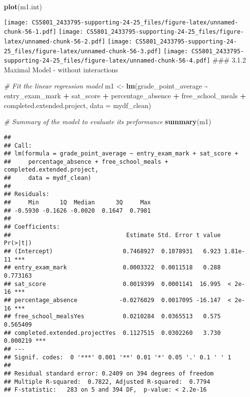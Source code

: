 \documentclass[
]{article}
\newenvironment{Shaded}{\begin{snugshade}}{\end{snugshade}}
\newcommand{\AttributeTok}[1]{\textcolor[rgb]{0.13,0.29,0.53}{#1}}
\newcommand{\CommentTok}[1]{\textcolor[rgb]{0.56,0.35,0.01}{\textit{#1}}}
\newcommand{\FunctionTok}[1]{\textcolor[rgb]{0.13,0.29,0.53}{\textbf{#1}}}
\newcommand{\NormalTok}[1]{#1}
\newcommand{\OtherTok}[1]{\textcolor[rgb]{0.56,0.35,0.01}{#1}}
\newcommand{\SpecialCharTok}[1]{\textcolor[rgb]{0.81,0.36,0.00}{\textbf{#1}}}
\begin{document}
\begin{Shaded}
\begin{Highlighting}[]
\FunctionTok{plot}\NormalTok{(m1.int)}
\end{Highlighting}
\end{Shaded}

\texttt{[image: CS5801\_2433795-supporting-24-25\_files/figure-latex/unnamed-chunk-56-1.pdf]}
\texttt{[image: CS5801\_2433795-supporting-24-25\_files/figure-latex/unnamed-chunk-56-2.pdf]}
\texttt{[image: CS5801\_2433795-supporting-24-25\_files/figure-latex/unnamed-chunk-56-3.pdf]}
\texttt{[image: CS5801\_2433795-supporting-24-25\_files/figure-latex/unnamed-chunk-56-4.pdf]}
\#\#\# 3.1.2 Maximal Model - without interactions

\begin{Shaded}
\begin{Highlighting}[]
\CommentTok{\# Fit the linear regression model}
\NormalTok{m1 }\OtherTok{\textless{}{-}} \FunctionTok{lm}\NormalTok{(grade\_point\_average }\SpecialCharTok{\textasciitilde{}}\NormalTok{ entry\_exam\_mark }\SpecialCharTok{+}\NormalTok{ sat\_score }\SpecialCharTok{+}\NormalTok{ percentage\_absence }\SpecialCharTok{+}\NormalTok{ free\_school\_meals }\SpecialCharTok{+}\NormalTok{ completed.extended.project, }\AttributeTok{data =}\NormalTok{ mydf\_clean)}

\CommentTok{\# Summary of the model to evaluate its performance}
\FunctionTok{summary}\NormalTok{(m1)}
\end{Highlighting}
\end{Shaded}

\begin{verbatim}
## 
## Call:
## lm(formula = grade_point_average ~ entry_exam_mark + sat_score + 
##     percentage_absence + free_school_meals + completed.extended.project, 
##     data = mydf_clean)
## 
## Residuals:
##     Min      1Q  Median      3Q     Max 
## -0.5930 -0.1626 -0.0020  0.1647  0.7981 
## 
## Coefficients:
##                                 Estimate Std. Error t value Pr(>|t|)    
## (Intercept)                    0.7468927  0.1078931   6.923 1.81e-11 ***
## entry_exam_mark                0.0003322  0.0011518   0.288 0.773163    
## sat_score                      0.0019399  0.0001141  16.995  < 2e-16 ***
## percentage_absence            -0.0276029  0.0017095 -16.147  < 2e-16 ***
## free_school_mealsYes           0.0210284  0.0365513   0.575 0.565409    
## completed.extended.projectYes  0.1127515  0.0302260   3.730 0.000219 ***
## ---
## Signif. codes:  0 '***' 0.001 '**' 0.01 '*' 0.05 '.' 0.1 ' ' 1
## 
## Residual standard error: 0.2409 on 394 degrees of freedom
## Multiple R-squared:  0.7822, Adjusted R-squared:  0.7794 
## F-statistic:   283 on 5 and 394 DF,  p-value: < 2.2e-16
\end{verbatim}
\end{document}
